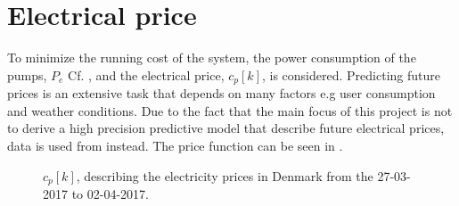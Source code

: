 \chapter{Electrical price}\label{sec:cost_fkt} %
%
%
To minimize the running cost of the system, the power consumption of the pumps, $P_e$ Cf. , and the electrical price, $c_p[k]$, is considered. Predicting future prices is an extensive task that depends on many factors e.g user consumption and weather conditions. Due to the fact that the main focus of this project is not to derive a high precision predictive model that describe future electrical prices, data is used from \cite{Electrical_price} instead. The price function can be seen in . 





	


\begin{figure}[H]
\centering

\caption{$c_p[k]$, describing the electricity prices in Denmark from the 27-03-2017 to 02-04-2017.}
\label{fig:electrical_price} 
\end{figure}

